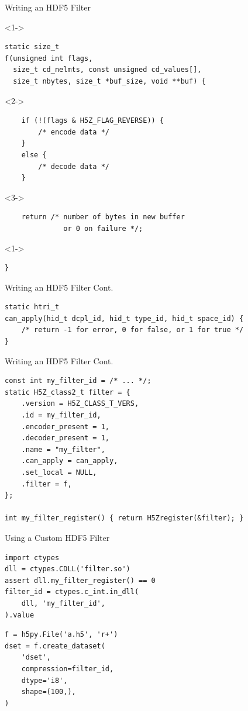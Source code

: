 \documentclass{beamer}
\begin{document}
\begin{frame}[fragile]{Writing an HDF5 Filter}
  \begin{onslide}<1->
    \begin{verbatim}
static size_t
f(unsigned int flags,
  size_t cd_nelmts, const unsigned cd_values[],
  size_t nbytes, size_t *buf_size, void **buf) {
    \end{verbatim}
  \end{onslide}
  \begin{onslide}<2->
    \begin{verbatim}
    if (!(flags & H5Z_FLAG_REVERSE)) {
        /* encode data */
    }
    else {
        /* decode data */
    }
      \end{verbatim}
  \end{onslide}
  \begin{onslide}<3->
      \begin{verbatim}
    return /* number of bytes in new buffer
              or 0 on failure */;
    \end{verbatim}
  \end{onslide}
  \begin{onslide}<1->
    \begin{verbatim}
}
    \end{verbatim}
  \end{onslide}  
\end{frame}

\begin{frame}[fragile]{Writing an HDF5 Filter Cont.}
  \begin{verbatim}
static htri_t
can_apply(hid_t dcpl_id, hid_t type_id, hid_t space_id) {
    /* return -1 for error, 0 for false, or 1 for true */
}
  \end{verbatim}
\end{frame}

\begin{frame}[fragile]{Writing an HDF5 Filter Cont.}
  \begin{verbatim}
const int my_filter_id = /* ... */;
static H5Z_class2_t filter = {
    .version = H5Z_CLASS_T_VERS,
    .id = my_filter_id,
    .encoder_present = 1,
    .decoder_present = 1,
    .name = "my_filter",
    .can_apply = can_apply,
    .set_local = NULL,
    .filter = f,
};

int my_filter_register() { return H5Zregister(&filter); }
  \end{verbatim}
\end{frame}

\begin{frame}[fragile]{Using a Custom HDF5 Filter}
\begin{verbatim}
import ctypes
dll = ctypes.CDLL('filter.so')
assert dll.my_filter_register() == 0
filter_id = ctypes.c_int.in_dll(
    dll, 'my_filter_id',
).value
  \end{verbatim}
  \pause

  \begin{verbatim}
f = h5py.File('a.h5', 'r+')
dset = f.create_dataset(
    'dset',
    compression=filter_id,
    dtype='i8',
    shape=(100,),
)
  \end{verbatim}
\end{frame}
\end{document}
